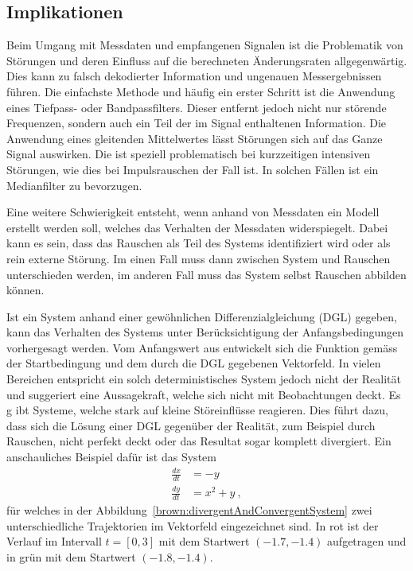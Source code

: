 \subsection{Implikationen\label{brown:Rauschen:Implikationen}}

Beim Umgang mit Messdaten und empfangenen Signalen ist die Problematik von Störungen und deren Einfluss auf die berechneten Änderungsraten allgegenwärtig. Dies  kann zu falsch dekodierter Information und ungenauen Messergebnissen führen. Die einfachste Methode und häufig ein erster Schritt ist die Anwendung eines Tiefpass- oder Bandpassfilters. Dieser entfernt jedoch nicht nur störende Frequenzen, sondern auch ein Teil der im Signal enthaltenen Information. Die Anwendung eines gleitenden Mittelwertes lässt Störungen sich auf das Ganze Signal auswirken. Die ist speziell problematisch bei kurzzeitigen intensiven Störungen, wie dies bei Impulsrauschen der Fall ist. In solchen Fällen ist ein Medianfilter zu bevorzugen.

Eine weitere Schwierigkeit entsteht, wenn anhand von Messdaten ein Modell erstellt werden soll, welches das Verhalten der Messdaten widerspiegelt. Dabei kann es sein, dass das Rauschen als Teil des Systems identifiziert wird oder als rein externe Störung. Im einen Fall muss dann zwischen System und Rauschen unterschieden werden, im anderen Fall muss das System selbst Rauschen abbilden können.

Ist ein System anhand einer gewöhnlichen Differenzialgleichung (DGL) gegeben, kann das Verhalten des Systems unter Berücksichtigung der Anfangsbedingungen vorhergesagt werden. Vom Anfangswert aus entwickelt sich die Funktion gemäss der Startbedingung und dem durch die DGL gegebenen Vektorfeld. In vielen Bereichen entspricht ein solch deterministisches System jedoch nicht der Realität und suggeriert eine Aussagekraft, welche sich nicht mit Beobachtungen deckt. Es g
ibt Systeme, welche stark auf kleine Störeinflüsse reagieren. Dies führt dazu, dass sich die Lösung einer DGL gegenüber der Realität, zum Beispiel durch Rauschen, nicht perfekt deckt oder das Resultat sogar komplett divergiert. Ein anschauliches Beispiel dafür ist das System
\begin{align}
	\frac{dx}{dt} &= -y \\
	\frac{dy}{dt} &= x^2 + y
	\label{brown:divergentEquation} \ ,
\end{align}
für welches in der Abbildung~\ref{brown:divergentAndConvergentSystem} zwei unterschiedliche Trajektorien im Vektorfeld eingezeichnet sind. In rot ist der Verlauf im Intervall  $ t = [0, 3] $ mit dem Startwert $ (-1.7, -1.4) $ aufgetragen und in grün mit dem Startwert $ (-1.8, -1.4) $.

